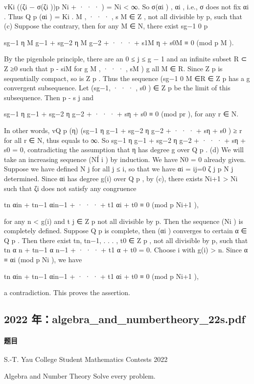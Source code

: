 \documentclass[UTF8,12pt]{ctexart}
\begin{document}
vKi ((ζi − σ(ζi ))p Ni + · · · ) = Ni < ∞. So σ(αi ) , αi , i.e., σ does not fix αi . Thus Q p (αi ) = Ki . M , · · · , s M ∈ Z , not all divisible by p, such that (c) Suppose the contrary, then for any M ∈ N, there exist sg−1 0 p

sg−1 η M g−1 + sg−2 η M g−2 + · · · + s1M η + s0M ≡ 0 (mod p M ).

By the pigenhole principle, there are an 0 ≤ j ≤ g − 1 and an infinite subset R ⊂ Z ≥0 such that p - siM for g M , · · · , sM ) g all M ∈ R. Since Z p is sequentially compact, so is Z p . Thus the sequence (sg−1 0 M ∈R ∈ Z p has a g convergent subsequence. Let (sg−1, · · · , s0 ) ∈ Z p be the limit of this subsequence. Then p - s j and

sg−1 η g−1 + sg−2 η g−2 + · · · + sη + s0 ≡ 0 (mod pr ), for any r ∈ N.

In other words, vQ p (η) (sg−1 η g−1 + sg−2 η g−2 + · · · + sη + s0 ) ≥ r for all r ∈ N, thus equals to ∞. So sg−1 η g−1 + sg−2 η g−2 + · · · + sη + s0 = 0, contradicting the assumption that η has degree g over Q p . (d) We will take an increasing sequence (NÍ i ) by induction. We have N0 = 0 already given. Suppose we have defined N j for all j ≤ i, so that we have αi = ij=0 ζ j p N j determined. Since αi has degree g(i) over Q p , by (c), there exists Ni+1 > Ni such that ζi does not satisfy any congruence

tn αin + tn−1 αin−1 + · · · + t1 αi + t0 ≡ 0 (mod p Ni+1 ),

for any n < g(i) and t j ∈ Z p not all divisible by p. Then the sequence (Ni ) is completely defined. Suppose Q p is complete, then (αi ) converges to certain α ∈ Q p . Then there exist tn, tn−1, . . . , t0 ∈ Z p , not all divisible by p, such that tn α n + tn−1 α n−1 + · · · + t1 α + t0 = 0. Choose i with g(i) > n. Since α ≡ αi (mod p Ni ), we have

tn αin + tn−1 αin−1 + · · · + t1 αi + t0 ≡ 0 (mod p Ni+1 ),

a contradiction. This proves the assertion.

\subsection{2022 年：algebra\_and\_numbertheory\_22s.pdf}
\paragraph{题目}
S.-T. Yau College Student Mathematics Contests 2022

Algebra and Number Theory Solve every problem.
\end{document}
